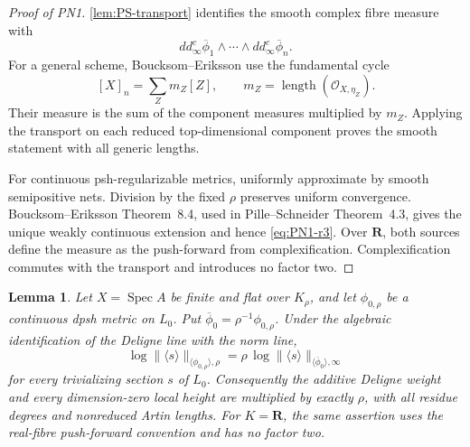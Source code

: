 \documentclass[11pt]{article}
\newtheorem{lemma}[theorem]{Lemma}
\newcommand{\R}{\mathbf R}
\newcommand{\norm}[1]{\lVert#1\rVert}
\begin{document}
\begin{proof}[Proof of PN1]
\cref{lem:PS-transport} identifies the smooth complex fibre measure with
\[
 dd^c_\infty\overline\phi_1\wedge\cdots\wedge
 dd^c_\infty\overline\phi_n.
\]
For a general scheme, Boucksom--Eriksson use the fundamental cycle
\[
 [X]_n=\sum_Zm_Z[Z],
 \qquad
 m_Z=\operatorname{length}(\mathcal O_{X,\eta_Z}).
\]
Their measure is the sum of the component measures multiplied by $m_Z$.
Applying the transport on each reduced top-dimensional component proves the
smooth statement with all generic lengths.

For continuous psh-regularizable metrics, uniformly approximate by smooth
semipositive nets.  Division by the fixed $\rho$ preserves uniform
convergence.  Boucksom--Eriksson Theorem~8.4, used in Pille--Schneider
Theorem~4.3, gives the unique weakly continuous extension and hence
\eqref{eq:PN1-r3}.  Over $\R$, both sources define the measure as the
push-forward from complexification.  Complexification commutes with the
transport and introduces no factor two.
\end{proof}

\begin{lemma}
\label{lem:zero-anchor-r3}
Let $X=\operatorname{Spec}A$ be finite and flat over $K_\rho$, and let
$\phi_{0,\rho}$ be a continuous dpsh metric on $L_0$.  Put
$\overline\phi_0=\rho^{-1}\phi_{0,\rho}$.  Under the algebraic
identification of the Deligne line with the norm line,
\begin{equation}
 \log\norm{\langle s\rangle}_{\langle\phi_{0,\rho}\rangle,\rho}
 =\rho\,
 \log\norm{\langle s\rangle}_{\langle\overline\phi_0\rangle,\infty}
\tag{Z0}\label{eq:zero-metric-r3}
\end{equation}
for every trivializing section $s$ of $L_0$.  Consequently the additive
Deligne weight and every dimension-zero local height are multiplied by
exactly $\rho$, with all residue degrees and nonreduced Artin lengths.
For $K=\R$, the same assertion uses the real-fibre push-forward convention
and has no factor two.
\end{lemma}
\end{document}
